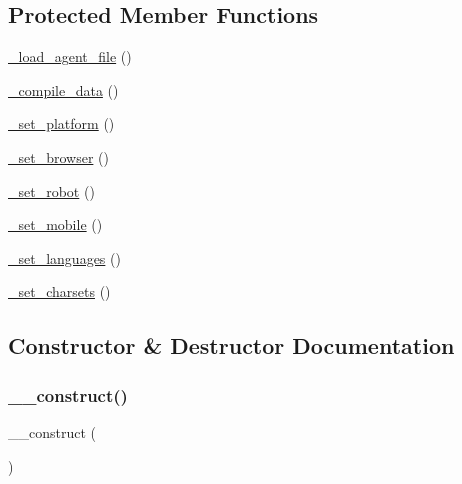 \subsection*{Protected Member Functions}
\begin{DoxyCompactItemize}
\item 
\mbox{\hyperlink{class_c_i___user__agent_a96ec01490c667b47c5faec7cb53c34b2}{\+\_\+load\+\_\+agent\+\_\+file}} ()
\item 
\mbox{\hyperlink{class_c_i___user__agent_a4ced3acbcc2ab5e599f212c676590d06}{\+\_\+compile\+\_\+data}} ()
\item 
\mbox{\hyperlink{class_c_i___user__agent_a3e3af24bc0adb0483c3965765b28a25b}{\+\_\+set\+\_\+platform}} ()
\item 
\mbox{\hyperlink{class_c_i___user__agent_a6788d0353e44d81a1214fe367ebce0f5}{\+\_\+set\+\_\+browser}} ()
\item 
\mbox{\hyperlink{class_c_i___user__agent_a037f28a8a54578f57417d15fae820817}{\+\_\+set\+\_\+robot}} ()
\item 
\mbox{\hyperlink{class_c_i___user__agent_aa2b84face2c8bd1830f618bf9a57f196}{\+\_\+set\+\_\+mobile}} ()
\item 
\mbox{\hyperlink{class_c_i___user__agent_a14307e07c78ada7733b36660bce03db8}{\+\_\+set\+\_\+languages}} ()
\item 
\mbox{\hyperlink{class_c_i___user__agent_ae97780ac0ec104137f47641061288f3c}{\+\_\+set\+\_\+charsets}} ()
\end{DoxyCompactItemize}


\subsection{Constructor \& Destructor Documentation}
\mbox{\label{class_c_i___user__agent_a095c5d389db211932136b53f25f39685}} 
\subsubsection{\texorpdfstring{\+\_\+\+\_\+construct()}{\_\_construct()}}
{\footnotesize\ttfamily \+\_\+\+\_\+construct (\begin{DoxyParamCaption}{ }\end{DoxyParamCaption})}

